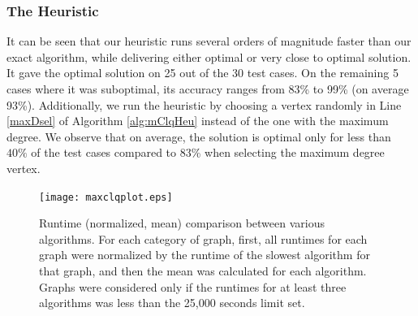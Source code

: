 \subsubsection{The Heuristic}
\label{sec:exp-heuristic}

It can be seen that our heuristic runs several orders of magnitude faster than our exact algorithm,
while delivering either optimal or very close to optimal solution.
It gave the optimal solution on 25 out of the 30 test cases.
On the remaining 5 cases where it was suboptimal, its accuracy ranges from 83\% to 99\% (on average 93\%).
Additionally, we run the heuristic by choosing a vertex randomly in Line \ref{maxDsel} of Algorithm \ref{alg:mClqHeu} instead of the one with the maximum degree. We observe that on average, the solution is optimal only for less than $40\%$ of the test cases compared to 83\% when selecting the maximum degree vertex.

\begin{figure}
  \centering
    \texttt{[image: maxclqplot.eps]}
  \caption{Runtime (normalized, mean) comparison between various algorithms. For each category of graph, first, all runtimes for each graph were normalized by the runtime of the slowest algorithm for that graph, and then the mean was calculated for each algorithm. Graphs were considered only if the runtimes for at least three algorithms was less than the 25,000 seconds limit set.}
\label{fig-timeplot}
\end{figure}


